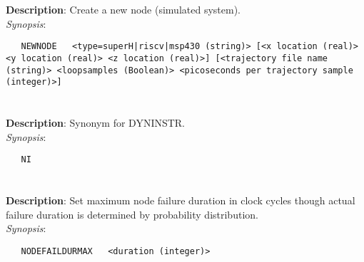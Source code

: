 \section{\quad{}}
\label{manpages:NEWNODE}
\label{manpages:newnode}
\vspace{-0.1in}
{\bf Description}: 	Create a new node (simulated system).\\[1.5ex]
{\em Synopsis}:
\vspace{-0.05in}
\scriptsize
\begin{lstlisting}
   NEWNODE   <type=superH|riscv|msp430 (string)> [<x location (real)> <y location (real)> <z location (real)>] [<trajectory file name (string)> <loopsamples (Boolean)> <picoseconds per trajectory sample (integer)>]	
\end{lstlisting}
\normalsize
\vspace{-0.05in}


\section{\quad{}}
\label{manpages:NI}
\label{manpages:ni}
\vspace{-0.1in}
{\bf Description}: 	Synonym for DYNINSTR.\\[1.5ex]
{\em Synopsis}:
\vspace{-0.05in}
\scriptsize
\begin{lstlisting}
   NI   											
\end{lstlisting}
\normalsize
\vspace{-0.05in}


\section{\quad{}}
\label{manpages:NODEFAILDURMAX}
\label{manpages:nodefaildurmax}
\vspace{-0.1in}
{\bf Description}: 	Set maximum node failure duration in clock cycles though actual failure duration is determined by probability distribution.\\[1.5ex]
{\em Synopsis}:
\vspace{-0.05in}
\scriptsize
\begin{lstlisting}
   NODEFAILDURMAX   <duration (integer)>							
\end{lstlisting}
\normalsize
\vspace{-0.05in}


